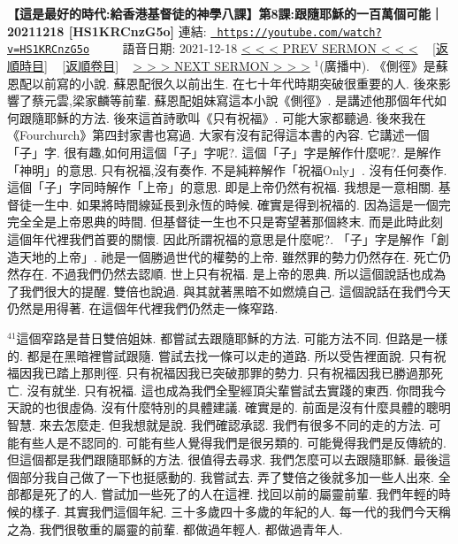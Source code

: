 \documentclass{book}
\begin{document}
\section{}
\label{sec:HS1KRCnzG5o}
\textbf{【這是最好的時代:給香港基督徒的神學八課】第8課:跟隨耶穌的一百萬個可能｜20211218 [HS1KRCnzG5o]}
\newline
\newline
連結: \href{https://youtube.com/watch?v=HS1KRCnzG5o}{\texttt{ https://youtube.com/watch?v=HS1KRCnzG5o}} ~~~~ 語音日期: 2021-12-18 
\newline
\newline
\hyperref[sec:cYPXvL44u1Y]{\small{< < < PREV SERMON < < <}}
~
\hyperref[sec:index_chronic]{\small{[返順時目]}}
~
\hyperref[sec:index_scriptual]{\small{[返順卷目]}}
~
\hyperref[sec:49X8yc0UC2g]{\small{> > > NEXT SERMON > > >}}
\newline
\newline
$^{1}$(廣播中).
《側徑》是蘇恩配以前寫的小說.
蘇恩配很久以前出生.
在七十年代時期突破很重要的人.
後來影響了蔡元雲,梁家麟等前輩.
蘇恩配姐妹寫這本小說《側徑》.
是講述他那個年代如何跟隨耶穌的方法.
後來這首詩歌叫《只有祝福》.
可能大家都聽過.
後來我在《Fourchurch》第四封家書也寫過.
大家有沒有記得這本書的內容.
它講述一個「子」字.
很有趣,如何用這個「子」字呢?.
這個「子」字是解作什麼呢?.
是解作「神明」的意思.
只有祝福,沒有奏作.
不是純粹解作「祝福Only」.
沒有任何奏作.
這個「子」字同時解作「上帝」的意思.
即是上帝仍然有祝福.
我想是一意相關.
基督徒一生中.
如果將時間線延長到永恆的時候.
確實是得到祝福的.
因為這是一個完完全全是上帝恩典的時間.
但基督徒一生也不只是寄望著那個終末.
而是此時此刻這個年代裡我們首要的關懷.
因此所謂祝福的意思是什麼呢?.
「子」字是解作「創造天地的上帝」.
祂是一個勝過世代的權勢的上帝.
雖然罪的勢力仍然存在.
死亡仍然存在.
不過我們仍然去認順.
世上只有祝福.
是上帝的恩典.
所以這個說話也成為了我們很大的提醒.
雙倍也說過.
與其就著黑暗不如燃燒自己.
這個說話在我們今天仍然是用得著.
在這個年代裡我們仍然走一條窄路.

$^{41}$這個窄路是昔日雙倍姐妹.
都嘗試去跟隨耶穌的方法.
可能方法不同.
但路是一樣的.
都是在黑暗裡嘗試跟隨.
嘗試去找一條可以走的道路.
所以受告裡面說.
只有祝福因我已踏上那則徑.
只有祝福因我已突破那罪的勢力.
只有祝福因我已勝過那死亡.
沒有就坐.
只有祝福.
這也成為我們全聖經頂尖輩嘗試去實踐的東西.
你問我今天說的也很虛偽.
沒有什麼特別的具體建議.
確實是的.
前面是沒有什麼具體的聰明智慧.
來去怎麼走.
但我想就是說.
我們確認承認.
我們有很多不同的走的方法.
可能有些人是不認同的.
可能有些人覺得我們是很另類的.
可能覺得我們是反傳統的.
但這個都是我們跟隨耶穌的方法.
很值得去尋求.
我們怎麼可以去跟隨耶穌.
最後這個部分我自己做了一下也挺感動的.
我嘗試去.
弄了雙倍之後就多加一些人出來.
全部都是死了的人.
嘗試加一些死了的人在這裡.
找回以前的屬靈前輩.
我們年輕的時候的樣子.
其實我們這個年紀.
三十多歲四十多歲的年紀的人.
每一代的我們今天稱之為.
我們很敬重的屬靈的前輩.
都做過年輕人.
都做過青年人.
\end{document}
